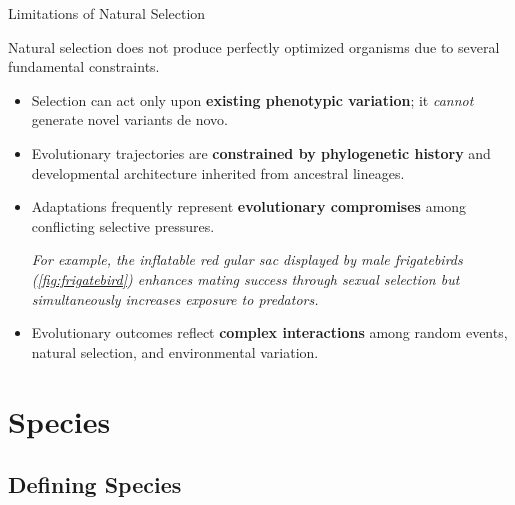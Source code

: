 \documentclass[10pt]{article}
\begin{document}
    \begin{core}{Limitations of Natural Selection}

      Natural selection does not produce perfectly optimized organisms due to several fundamental constraints.

      \begin{itemize}

        \item Selection can act only upon \textbf{existing phenotypic variation}; it \textit{cannot} generate novel variants de novo.

        \item Evolutionary trajectories are \textbf{constrained by phylogenetic history} and developmental architecture inherited from ancestral lineages.

        \item Adaptations frequently represent \textbf{evolutionary compromises} among conflicting selective pressures.


        \textit{For example, the inflatable red gular sac displayed by male frigatebirds (\autoref{fig:frigatebird}) enhances mating success through sexual selection but simultaneously increases exposure to predators.}

        \item Evolutionary outcomes reflect \textbf{complex interactions} among random events, natural selection, and environmental variation.

      \end{itemize}

    \end{core}

\section{Species}

  \subsection{Defining Species}
\end{document}
